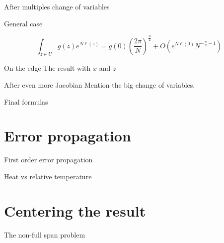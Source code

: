 \documentclass{beamer}
\begin{document}
\begin{frame}[fragile]{After multiples change of variables}

  \begin{center}
    \large General case
  \end{center}
  \[\int_{z \in U}g(z)e^{N \ell(z)}= g(0)
      {\left(\frac {2\pi}{N}\right)}^{\frac n 2}
      + O(e^{N\ell(0)} N^{-\frac n 2 -1})\]



\end{frame}

\begin{frame}{On the edge}
  The result with $x$ and $z$
\end{frame}

\begin{frame}{After even more Jacobian}
  Mention the big change of variables.
\end{frame}

\begin{frame}{Final formulas}
\end{frame}



\section{Error propagation}

\begin{frame}{First order error propagation}
\end{frame}

\begin{frame}{Heat vs relative temperature}
\end{frame}



\section{Centering the result}

\begin{frame}{The non-full span problem}
\end{frame}
\end{document}

